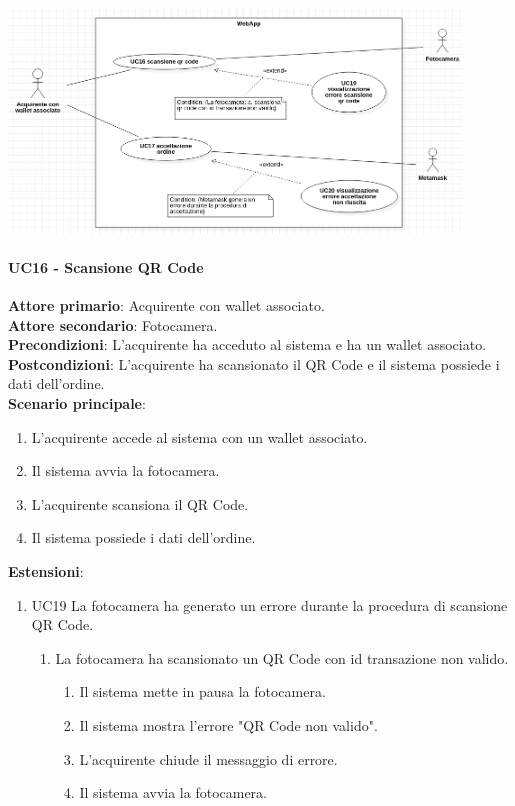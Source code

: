 \documentclass[a4paper, 12pt]{article}
\begin{document}
\includegraphics[width=0.9\textwidth]{UseCase_webapp3}

\paragraph{UC16 - Scansione QR Code}
\textbf{Attore primario}: Acquirente con wallet associato.\\
\textbf{Attore secondario}: Fotocamera.\\
\textbf{Precondizioni}: L'acquirente ha acceduto al sistema e ha un wallet associato.\\
\textbf{Postcondizioni}: L'acquirente ha scansionato il QR Code e il sistema possiede i dati dell'ordine.\\
\textbf{Scenario principale}:
\begin{enumerate}
    \item L'acquirente accede al sistema con un wallet associato.
    \item Il sistema avvia la fotocamera.
    \item L'acquirente scansiona il QR Code.
    \item Il sistema possiede i dati dell'ordine.
\end{enumerate}
\textbf{Estensioni}:
\begin{enumerate}
    \item UC19 La fotocamera ha generato un errore durante la procedura di scansione QR Code.
    \begin{enumerate}
        \item La fotocamera ha scansionato un QR Code con id transazione non valido.
        \begin{enumerate}
            \item Il sistema mette in pausa la fotocamera.
            \item Il sistema mostra l'errore "QR Code non valido".
            \item L'acquirente chiude il messaggio di errore.
            \item Il sistema avvia la fotocamera.
        \end{enumerate}
    \end{enumerate}
\end{enumerate}
\end{document}
